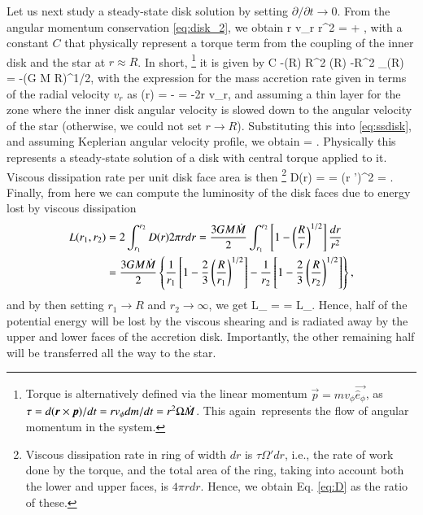 Let us next study a steady-state disk solution by setting $\partial/\partial t \rightarrow 0$.
From the angular momentum conservation \eqref{eq:disk_2}, we obtain
\be\label{eq:ssdisk}
r \Sigma v_{r} r^2 \Omega = \frac{\tau}{2\pi} + ,
\ee
with a constant $C$ that physically represent a torque term from the coupling of the inner disk and the star at $r \approx R$.
In short,%
\footnote{Torque is alternatively defined via the linear momentum $\vec{p} = m v_{\phi} \vec{\hat{e}_{\phi}}$, as $\tau = d(\boldsymbol{r} \times \boldsymbol{p})/dt = r v_{\phi} dm/dt = r^2 \Omega \dot{M}$. 
This again represents the flow of angular momentum in the system.
}
it is given by
\be\label{eq:visc_torque}
C \approx -\Mdot(R) R^2 \Omega(R) \approx -\Mdot R^2 \Omega_{}(R) = -\Mdot (G M R)^{1/2},
\ee
with the expression for the mass accretion rate given in terms of the radial velocity $v_r$ as
\be
\Mdot(r) = - = -2\pi r \Sigma v_r,
\ee
and assuming a thin layer for the zone where the inner disk angular velocity is slowed down to the angular velocity of the star (otherwise, we could not set $r \rightarrow R$).
Substituting this into \eqref{eq:ssdisk}, and assuming Keplerian angular velocity profile, we obtain
\be
\nu \Sigma = \frac{\Mdot}{3\pi} .
\ee
Physically this represents a steady-state solution of a disk with central torque applied to it.
Viscous dissipation rate per unit disk face area is then%
\footnote{Viscous dissipation rate in ring of width $dr$ is $\tau \Omega' dr$, i.e., the rate of work done by the torque, and the total area of the ring, taking into account both the lower and upper faces, is $4\pi r dr$. Hence, we obtain Eq. \eqref{eq:D} as the ratio of these.
}
\be\label{eq:D}
D(r) =  =  \nu \Sigma (r \Omega')^2 =  .
\ee
Finally, from here we can compute the luminosity of the disk faces due to energy lost by viscous dissipation
\begin{align}\begin{split}
    L(r_1, r_2)  &= 2 \int_{r_1}^{r_2} D(r) 2\pi r dr = \frac{3 G M \dot{M}}{2} \int_{r_1}^{r_2} \left[ 1 - \left( \frac{R}{r} \right)^{1/2} \right] \frac{dr}{r^2} \\
 & = \frac{3 G M \dot{M}}{2} \left\{ \frac{1}{r_1} \left[ 1 - \frac{2}{3}\left( \frac{R}{r_1} \right)^{1/2} \right] -  \frac{1}{r_2} \left[ 1 - \frac{2}{3}\left( \frac{R}{r_2} \right)^{1/2} \right] \right\}, 
\end{split}\end{align}
and by then setting $r_1 \rightarrow R$ and $r_2 \rightarrow \infty$, we get
\be
L_{} =  =  L_{}.
\ee
Hence, half of the potential energy will be lost by the viscous shearing and is radiated away by the upper and lower faces of the accretion disk.
Importantly, the other remaining half will be transferred all the way to the star.

